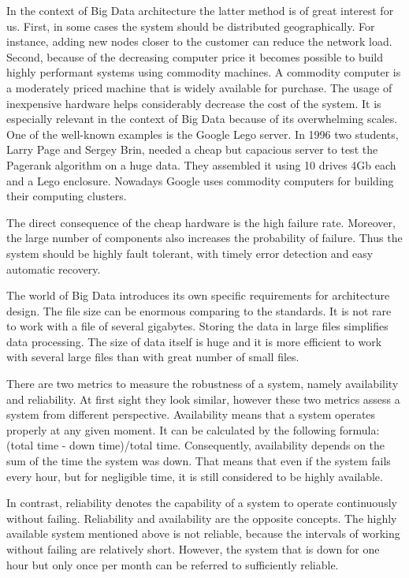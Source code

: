 In the context of Big Data architecture the latter method is of great interest for us.
First, in some cases the system should be distributed geographically.
For instance, adding new nodes closer to the customer can reduce the network load.
Second, because of the decreasing computer price it becomes possible to build highly performant systems using commodity machines.
A commodity computer is a moderately priced machine that is widely available for purchase.
The usage of inexpensive hardware helps considerably decrease the cost of the system.
It is especially relevant in the context of Big Data because of its overwhelming scales.
One of the well-known examples is the Google Lego server.
In 1996 two students, Larry Page and Sergey Brin, needed a cheap but capacious server to test the Pagerank algorithm on a huge data. 
They assembled it using 10 drives 4Gb each and a Lego enclosure. 
Nowadays Google uses commodity computers for building their computing clusters.

The direct consequence of the cheap hardware is the high failure rate.
Moreover, the large number of components also increases the probability of failure. 
Thus the system should be highly fault tolerant, with timely error detection and easy automatic recovery.

The world of Big Data introduces its own specific requirements for architecture design.
The file size can be enormous comparing to the standards.
It is not rare to work with a file of several gigabytes.
Storing the data in large files simplifies data processing.
The size of data itself is huge and it is more efficient to work with several large files than with great number of small files.

There are two metrics to measure the robustness of a system, namely availability and reliability.
At first sight they look similar, however these two metrics assess a system from different perspective.
Availability means that a system operates properly at any given moment.
It can be calculated by the following formula: (total time - down time)/total time.
Consequently, availability depends on the sum of the time the system was down.
That means that even if the system fails every hour, but for negligible time, it is still considered to be highly available.

In contrast, reliability denotes the capability of a system to operate continuously without failing.
Reliability and availability are the opposite concepts.
The highly available system mentioned above is not reliable, because the intervals of working without failing are relatively short.
However, the system that is down for one hour but only once per month can be referred to sufficiently reliable.

